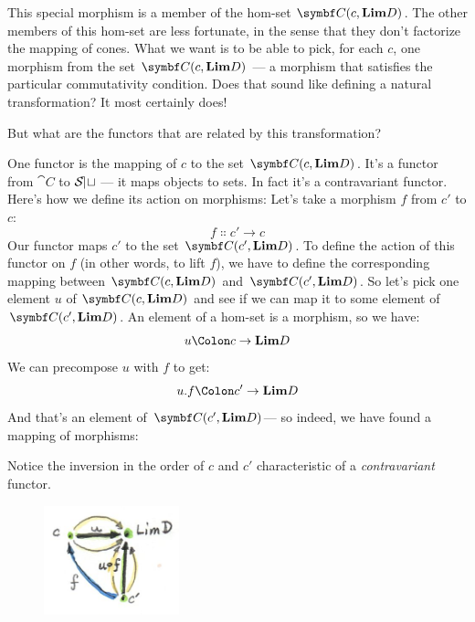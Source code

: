 This special morphism is a member of the hom-set $\cat{C}(c, \Lim[D])$.
The other members of this hom-set are less fortunate, in the sense that
they don't factorize the mapping of cones. What we want is to be able to
pick, for each $c$, one morphism from the set
$\cat{C}(c, \Lim[D])$ --- a morphism that satisfies the particular
commutativity condition. Does that sound like defining a natural
transformation? It most certainly does!

But what are the functors that are related by this transformation?

One functor is the mapping of $c$ to the set
$\cat{C}(c, \Lim[D])$. It's a functor from $\cat{C}$ to $\mathcal{S\mkern-3mu et}$ ---
it maps objects to sets. In fact it's a contravariant functor. Here's
how we define its action on morphisms: Let's take a morphism $f$
from $c'$ to $c$:
\[f \Colon c' \to c\]
Our functor maps $c'$ to the set
$\cat{C}(c', \Lim[D])$. To define the action of this functor on
$f$ (in other words, to lift $f$), we have to define the
corresponding mapping between $\cat{C}(c, \Lim[D])$ and
$\cat{C}(c', \Lim[D])$. So let's pick one element $u$ of
$\cat{C}(c, \Lim[D])$ and see if we can map it to some element of
$\cat{C}(c', \Lim[D])$. An element of a hom-set is a morphism, so
we have:
\[u \Colon c \to \Lim[D]\]
We can precompose $u$ with $f$ to get:
\[u . f \Colon c' \to \Lim[D]\]
And that's an element of $\cat{C}(c', \Lim[D])$--- so indeed, we
have found a mapping of morphisms:

Notice the inversion in the order of $c$ and $c'$
characteristic of a \emph{contravariant} functor.

\begin{figure}[H]
\centering
\includegraphics[width=0.35\textwidth]{images/homsetmapping.jpg}
\end{figure}

